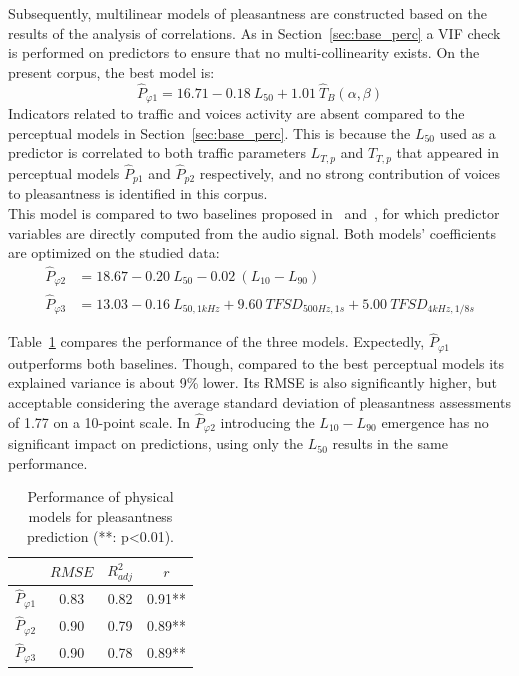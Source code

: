 \documentclass[11pt,a4paper]{article}
\begin{document}
Subsequently, multilinear models of pleasantness are constructed based on the results of the analysis of correlations. As in Section~\ref{sec:base_perc} a VIF check is performed on predictors to ensure that no multi-collinearity exists. On the present corpus, the best model is:
\begin{equation}
\hat P_{\varphi 1} = 16.71 - 0.18~L_{50} + 1.01~\hat T_B(\alpha, \beta)
\end{equation}
Indicators related to traffic and voices activity are absent compared to the perceptual models in Section~\ref{sec:base_perc}. This is because the $L_{50}$ used as a predictor is correlated to both traffic parameters $L_{T, p}$ and $T_{T, p}$ that appeared in perceptual models $\hat P_{p1}$ and $\hat P_{p2}$ respectively, and no strong contribution of voices to pleasantness is identified in this corpus.\\

This model is compared to two baselines proposed in~\cite{ricciardi2014} and~\cite{aumond2017}, for which predictor variables are directly computed from the audio signal. Both models' coefficients are optimized on the studied data:
\begin{align}
\hat P_{\varphi 2} &= 18.67 - 0.20~L_{50} - 0.02~(L_{10}-L_{90})\\
\hat P_{\varphi 3} &= 13.03 - 0.16~L_{50, 1kHz} + 9.60~TFSD_{500Hz, 1s} + 5.00~TFSD_{4kHz, 1/8s}
\end{align}

Table~\ref{tab:physm} compares the performance of the three models. Expectedly, $\hat P_{\varphi 1}$ outperforms both baselines. Though, compared to the best perceptual models its explained variance is about 9\% lower. Its RMSE is also significantly higher, but acceptable considering the average standard deviation of pleasantness assessments of 1.77 on a 10-point scale. In $\hat P_{\varphi 2}$ introducing the $L_{10}-L_{90}$ emergence has no significant impact on predictions, using only the $L_{50}$ results in the same performance.\\

\begin{table}[t]
\centering
\caption{Performance of physical models for pleasantness prediction (**: p<0.01).}
\label{tab:physm}
\begin{tabular}{ c | c | c | c }
\hline
	 & $RMSE$ & $R^2_{adj}$ & $r$ \\ \hline
	$\hat P_{\varphi 1}$ & 0.83 & 0.82 & 0.91** \\
	$\hat P_{\varphi 2}$ & 0.90 & 0.79 & 0.89** \\
	$\hat P_{\varphi 3}$ & 0.90 & 0.78 & 0.89** \\ \hline
\end{tabular}
\end{table}
\end{document}
